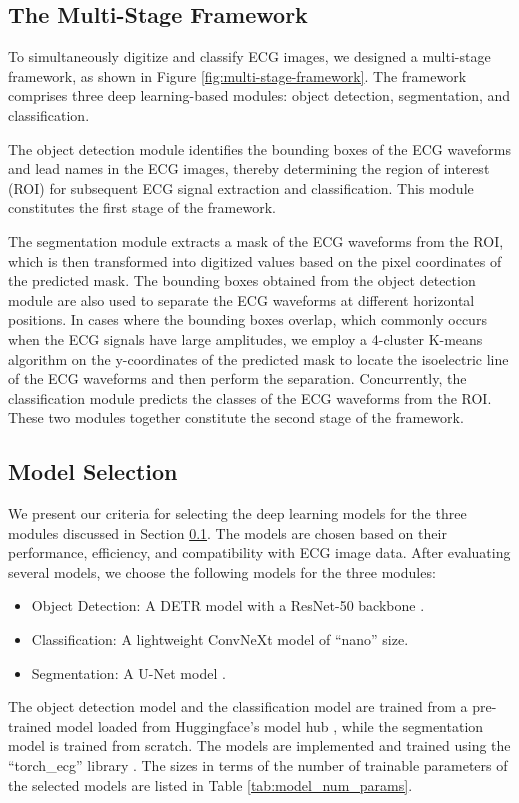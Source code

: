 \subsection{The Multi-Stage Framework}
\label{subsec:multi_stage_framework}


To simultaneously digitize and classify ECG images, we designed a multi-stage framework, as shown in Figure \ref{fig:multi-stage-framework}. The framework comprises three deep learning-based modules: object detection, segmentation, and classification.

The object detection module identifies the bounding boxes of the ECG waveforms and lead names in the ECG images, thereby determining the region of interest (ROI) for subsequent ECG signal extraction and classification. This module constitutes the first stage of the framework.

The segmentation module extracts a mask of the ECG waveforms from the ROI, which is then transformed into digitized values based on the pixel coordinates of the predicted mask. The bounding boxes obtained from the object detection module are also used to separate the ECG waveforms at different horizontal positions. In cases where the bounding boxes overlap, which commonly occurs when the ECG signals have large amplitudes, we employ a 4-cluster K-means algorithm on the y-coordinates of the predicted mask to locate the isoelectric line of the ECG waveforms and then perform the separation. Concurrently, the classification module predicts the classes of the ECG waveforms from the ROI. These two modules together constitute the second stage of the framework.

\subsection{Model Selection}
\label{subsec:model_selection}


We present our criteria for selecting the deep learning models for the three modules discussed in Section \ref{subsec:multi_stage_framework}. The models are chosen based on their performance, efficiency, and compatibility with ECG image data. After evaluating several models, we choose the following models for the three modules:
\begin{itemize}
\item[(1)] Object Detection: A DETR model \cite{carion2020DETR} with a ResNet-50 backbone \cite{resnet}.
\item[(2)] Classification: A lightweight ConvNeXt model \cite{Liu_2022_ConvNeXt} of ``nano'' size.
\item[(3)] Segmentation: A U-Net model \cite{unet}.
\end{itemize}
The object detection model and the classification model are trained from a pre-trained model loaded from Huggingface's model hub \cite{wolf-etal-2020-transformers}, while the segmentation model is trained from scratch. The models are implemented and trained using the ``torch\_ecg'' library \cite{torch_ecg_paper}. The sizes in terms of the number of trainable parameters of the selected models are listed in Table \ref{tab:model_num_params}.

